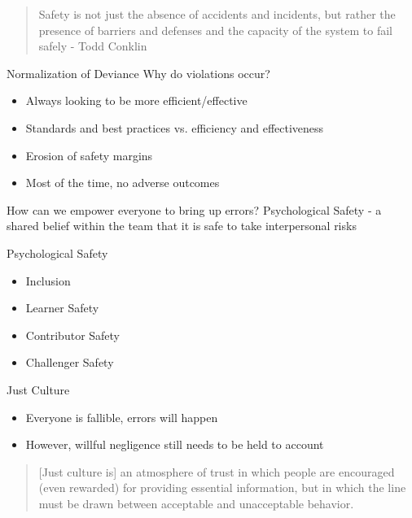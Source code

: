 \documentclass[aspectratio=169,notes]{beamer}
\begin{document}
\begin{frame}
    \begin{quote}
        Safety is not just the absence of accidents and incidents, but rather the presence of barriers and defenses and the capacity of the system to fail safely - Todd Conklin
    \end{quote}
\end{frame}
\begin{frame}{Normalization of Deviance}
    Why do violations occur?
    \begin{itemize}
        \item Always looking to be more efficient/effective
        \item Standards and best practices vs. efficiency and effectiveness
        \item Erosion of safety margins
        \item Most of the time, no adverse outcomes
    \end{itemize}
\end{frame}
\begin{frame}{How can we empower everyone to bring up errors?}
    Psychological Safety - a shared belief within the team that it is safe to take interpersonal risks
\end{frame}
\begin{frame}{Psychological Safety}
    \begin{itemize}
        \item Inclusion
        \item Learner Safety
        \item Contributor Safety
        \item Challenger Safety
    \end{itemize}
\end{frame}
\begin{frame}{Just Culture}
    \begin{itemize}
        \item Everyone is fallible, errors will happen
        \item However, willful negligence still needs to be held to account
    \end{itemize}

    \begin{quote}
        [Just culture is] an atmosphere of trust in which people are encouraged (even rewarded) for providing essential information, but in which the line must be drawn between acceptable and unacceptable behavior.
    \end{quote}
\end{frame}
\end{document}
